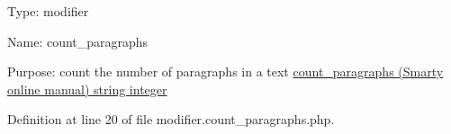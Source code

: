 \-Type\-: modifier\par
 \-Name\-: count\-\_\-paragraphs\par
 \-Purpose\-: count the number of paragraphs in a text \hyperlink{}{count\-\_\-paragraphs (\-Smarty online manual)  string  integer }

\-Definition at line 20 of file modifier.\-count\-\_\-paragraphs.\-php.


